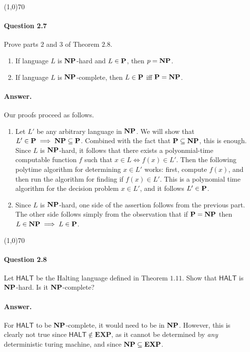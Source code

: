 \begin{center}
	\line(1,0){70}
\end{center}

\paragraph{Question 2.7} Prove parts $2$ and $3$ of Theorem $2.8$.
\begin{enumerate}
	\item If language $L$ is $\mathbf{NP}$-hard and $L\in\mathbf{P}$, then $p=\mathbf{NP}$.
	\item If language $L$ is $\mathbf{NP}$-complete, then $L\in\mathbf{P}$ iff $\mathbf{P}=\mathbf{NP}$.
\end{enumerate}

\paragraph{Answer.} Our proofs proceed as follows.

\begin{enumerate}
	\item Let $L'$ be any arbitrary language in $\mathbf{NP}$. We will show that $L'\in\mathbf{P}\implies\mathbf{NP}\subseteq\mathbf{P}$. Combined with the fact that $\mathbf{P}\subseteq\mathbf{NP}$, this is enough. Since $L$ is $\mathbf{NP}$-hard, it follows that there exists a polyonmial-time computable function $f$ such that $x\in L\iff f(x)\in L'$. Then the following polytime algorithm for determining $x\in L'$ works: first, compute $f(x)$, and then run the algorithm for finding if $f(x)\in L'$. This is a polynomial time algorithm for the decision problem $x\in L'$, and it follows $L'\in\mathbf{P}$.
	\item Since $L$ is $\mathbf{NP}$-hard, one side of the assertion follows from the previous part. The other side follows simply from the observation that if $\mathbf{P}=\mathbf{NP}$ then $L\in\mathbf{NP}\implies L\in\mathbf{P}$.
\end{enumerate}

\begin{center}
	\line(1,0){70}
\end{center}

\paragraph{Question 2.8} Let $\mathsf{HALT}$ be the Halting language defined in Theorem $1.11$. Show that $\mathsf{HALT}$ is $\mathbf{NP}$-hard. Is it $\mathbf{NP}$-complete?

\paragraph{Answer.} For $\mathsf{HALT}$ to be $\mathbf{NP}$-complete, it would need to be in $\mathbf{NP}$. However, this is clearly not true since $\mathsf{HALT}\notin\mathbf{EXP}$, as it cannot be determined by \textit{any} deterministic turing machine, and since $\mathbf{NP}\subseteq\mathbf{EXP}$.

